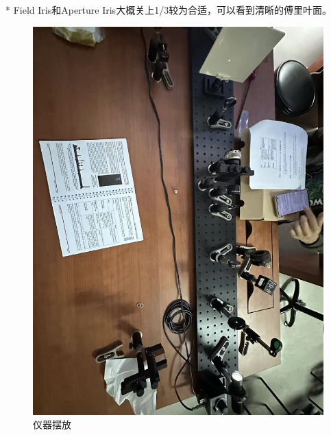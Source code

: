 \documentclass{ctexart}
\begin{document}
* Field Iris和Aperture Iris大概关上1/3较为合适，可以看到清晰的傅里叶面。
\begin{figure}[H]
  \centering
  \begin{minipage}[b]{0.2\textwidth}
    \centering
    \includegraphics[width=\textwidth]{pictures/微信图片_20241010201028.jpg}
    \caption{仪器摆放}
  \end{minipage}
  \hspace{0.05\textwidth} %
  \begin{minipage}[b]{0.2\textwidth}
    \centering

\end{minipage}
\end{figure}
\end{document}
